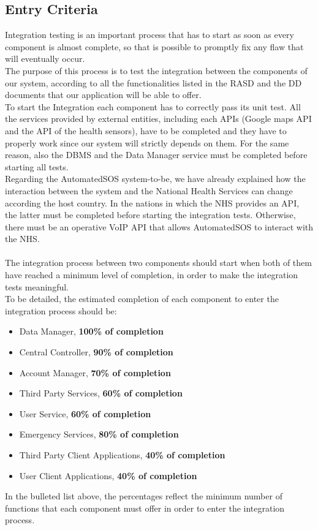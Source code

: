 \subsection{Entry Criteria}
Integration testing is an important process that has to start as soon as every component is almost complete, so that is possible to promptly fix any flaw that will eventually occur. \\
The purpose of this process is to test the integration between the components of our system, according to all the functionalities listed in the RASD and the DD documents that our application will be able to offer. \\
To start the Integration each component has to correctly pass its unit test.
All the services provided by external entities, including each APIs (Google maps API and the API of the health sensors), have to be completed and they have to properly work since our system will strictly depends on them. For the same reason, also the DBMS and the Data Manager service must be completed before starting all tests. \\
Regarding the AutomatedSOS system-to-be, we have already explained how the interaction between the system and the National Health Services can change according the host country. In the nations in which the NHS provides an API, the latter must be completed before starting the integration tests. Otherwise, there must be an operative VoIP API that allows AutomatedSOS to interact with the NHS.\\ \\
The integration process between two components should start when both of them have reached a minimum level of completion, in order to make the integration tests meaningful.\\
To be detailed, the estimated completion of each component to enter the integration process should be:
\begin{itemize}
    \item Data Manager, \textbf{100\% of completion}
    \item Central Controller, \textbf{90\% of completion}
    \item Account Manager, \textbf{70\% of completion}
    \item Third Party Services, \textbf{60\% of completion}
    \item User Service, \textbf{60\% of completion}
    \item Emergency Services, \textbf{80\% of completion}
    \item Third Party Client Applications, \textbf{40\% of completion}
    \item User Client Applications, \textbf{40\% of completion}
\end{itemize}
In the bulleted list above, the percentages reflect the minimum number of functions that each component must offer in order to enter the integration process.
\clearpage

